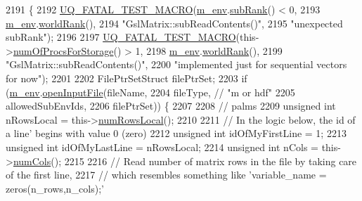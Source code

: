 \begin{DoxyCode}
2191 \{
2192   \hyperlink{_defines_8h_a56d63d18d0a6d45757de47fcc06f574d}{UQ\_FATAL\_TEST\_MACRO}(\hyperlink{class_q_u_e_s_o_1_1_matrix_a247fb0fc0b87fecdee054bb4660b68e8}{m\_env}.\hyperlink{class_q_u_e_s_o_1_1_base_environment_a172d52f993f1322ed45aaddf71518dbb}{subRank}() < 0,
2193                       \hyperlink{class_q_u_e_s_o_1_1_matrix_a247fb0fc0b87fecdee054bb4660b68e8}{m\_env}.\hyperlink{class_q_u_e_s_o_1_1_base_environment_a78b57112bbd0e6dd0e8afec00b40ffa7}{worldRank}(),
2194                       \textcolor{stringliteral}{"GslMatrix::subReadContents()"},
2195                       \textcolor{stringliteral}{"unexpected subRank"});
2196 
2197   \hyperlink{_defines_8h_a56d63d18d0a6d45757de47fcc06f574d}{UQ\_FATAL\_TEST\_MACRO}(this->\hyperlink{class_q_u_e_s_o_1_1_matrix_a7d7310149ecf33ca68c5ef7a815093db}{numOfProcsForStorage}() > 1,
2198                       \hyperlink{class_q_u_e_s_o_1_1_matrix_a247fb0fc0b87fecdee054bb4660b68e8}{m\_env}.\hyperlink{class_q_u_e_s_o_1_1_base_environment_a78b57112bbd0e6dd0e8afec00b40ffa7}{worldRank}(),
2199                       \textcolor{stringliteral}{"GslMatrix::subReadContents()"},
2200                       \textcolor{stringliteral}{"implemented just for sequential vectors for now"});
2201 
2202   FilePtrSetStruct filePtrSet;
2203   \textcolor{keywordflow}{if} (\hyperlink{class_q_u_e_s_o_1_1_matrix_a247fb0fc0b87fecdee054bb4660b68e8}{m\_env}.\hyperlink{class_q_u_e_s_o_1_1_base_environment_a8a3f76733a31991a1ed9a942feb2dc3c}{openInputFile}(fileName,
2204                           fileType, \textcolor{comment}{// "m or hdf"}
2205                           allowedSubEnvIds,
2206                           filePtrSet)) \{
2207 
2208     \textcolor{comment}{// palms}
2209     \textcolor{keywordtype}{unsigned} \textcolor{keywordtype}{int} nRowsLocal = this->\hyperlink{class_q_u_e_s_o_1_1_gsl_matrix_ab5ec937a9fd439eef1a87e12c0dbccb4}{numRowsLocal}();
2210 
2211     \textcolor{comment}{// In the logic below, the id of a line' begins with value 0 (zero)}
2212     \textcolor{keywordtype}{unsigned} \textcolor{keywordtype}{int} idOfMyFirstLine = 1;
2213     \textcolor{keywordtype}{unsigned} \textcolor{keywordtype}{int} idOfMyLastLine = nRowsLocal;
2214     \textcolor{keywordtype}{unsigned} \textcolor{keywordtype}{int} nCols = this->\hyperlink{class_q_u_e_s_o_1_1_gsl_matrix_ad5005f168fe030468e834776afb1859b}{numCols}();
2215 
2216     \textcolor{comment}{// Read number of matrix rows in the file by taking care of the first line,}
2217     \textcolor{comment}{// which resembles something like 'variable\_name = zeros(n\_rows,n\_cols);'}

\end{DoxyCode}
